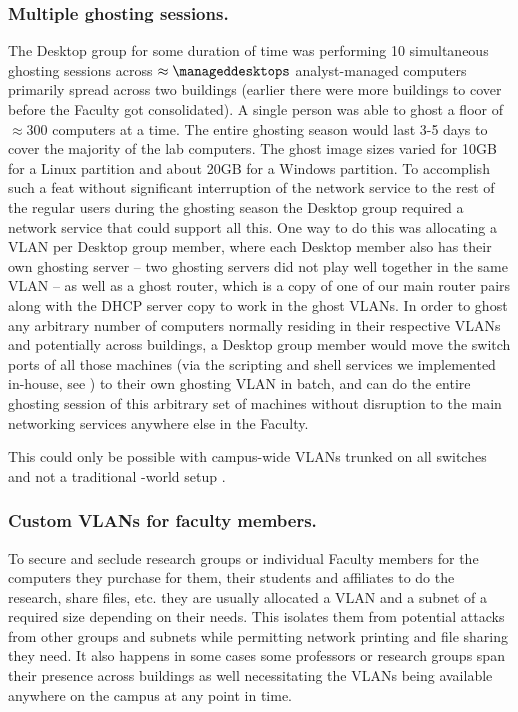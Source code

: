 \subsubsection{Multiple ghosting sessions.}
\label{sect:mult-ghosting-sessions}

The Desktop group for some duration of time was performing 10 simultaneous
ghosting sessions across $\approx {\manageddesktops}$ analyst-managed computers primarily
spread across two buildings (earlier there were more buildings to cover before
the Faculty got consolidated). A single person was able to ghost a floor of
$\approx 300$ computers at a time. The entire ghosting season would last 3-5 days
to cover the majority of the lab computers. The ghost image sizes varied
for 10GB for a Linux partition and about 20GB for a Windows partition.
To accomplish such a feat without significant interruption of the network
service to the rest of the regular users during the ghosting season
the Desktop group required a network service that could support all this.
One way to do this was allocating a VLAN per Desktop group member, where
each Desktop member also has their own ghosting server -- two ghosting
servers did not play well together in the same VLAN -- as well
as a ghost router, which is a copy of one of our main router pairs
along with the DHCP server copy to work in the ghost VLANs. In order to
ghost any arbitrary number of computers normally residing in their respective
VLANs and potentially across buildings, a Desktop group member would move
the switch ports of all those machines (via the scripting and shell services
we implemented in-house, see ) to their own ghosting VLAN
in batch, and can do the entire ghosting session of this arbitrary set of
machines without disruption to the main networking services anywhere else
in the Faculty.

This could only be possible with campus-wide VLANs trunked on all switches
and not a traditional {\cisco}-world setup \cite{cisco-lan-switching-99,cisco-catalyst-2950-2003}.


\subsubsection{Custom VLANs for faculty members.}
\label{sect:vlans-faculty}

To secure and seclude research groups or individual Faculty members for the
computers they purchase for them, their students and affiliates to do
the research, share files, etc. they are usually allocated a VLAN and a subnet
of a required size depending on their needs.
This isolates them from potential attacks from other groups and subnets
while permitting
network printing
and file sharing they need. It also happens
in some cases some professors or research groups span their presence across
buildings as well necessitating the VLANs being available anywhere on the
campus at any point in time.


